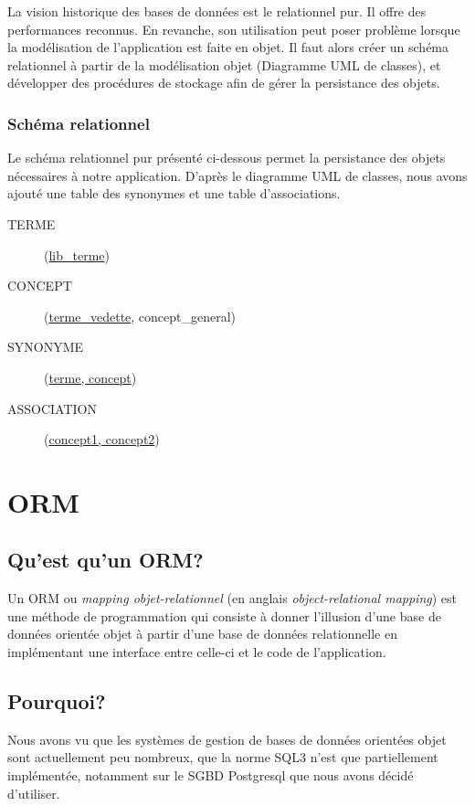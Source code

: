 La vision historique des bases de données est le relationnel pur. Il offre des performances reconnus. En revanche, son utilisation peut poser problème lorsque la modélisation de l'application est faite en objet. Il faut alors créer un schéma relationnel à partir de la modélisation objet (Diagramme UML de classes), et développer des procédures de stockage afin de gérer la persistance des objets.

\subsubsection{Schéma relationnel}

Le schéma relationnel pur présenté ci-dessous permet la persistance des objets nécessaires à notre application. D'après le diagramme UML de classes, nous avons ajouté une table des synonymes et une table d'associations.

\begin{description}
\item[TERME](\underline{lib\_terme})
\item[CONCEPT](\underline{terme\_vedette}\up{\#}, concept\_general\up{\#})
\item[SYNONYME](\underline{terme\up{\#}, concept\up{\#}})
\item[ASSOCIATION](\underline{concept1\up{\#}, concept2\up{\#}})
\end{description}

\section{ORM}

	\subsection{Qu'est qu'un ORM?}
    Un ORM ou \emph{mapping objet-relationnel} (en anglais \emph{object-relational mapping}) est une méthode de programmation qui consiste à donner l'illusion d'une base de données orientée objet à partir d'une base de données relationnelle en implémentant une interface entre celle-ci et le code de l'application.
   
	\subsection{Pourquoi?}
    Nous avons vu que les systèmes de gestion de bases de données orientées objet sont actuellement peu nombreux, que la norme SQL3 n'est que partiellement implémentée, notamment sur le SGBD Postgresql que nous avons décidé d'utiliser.
    
